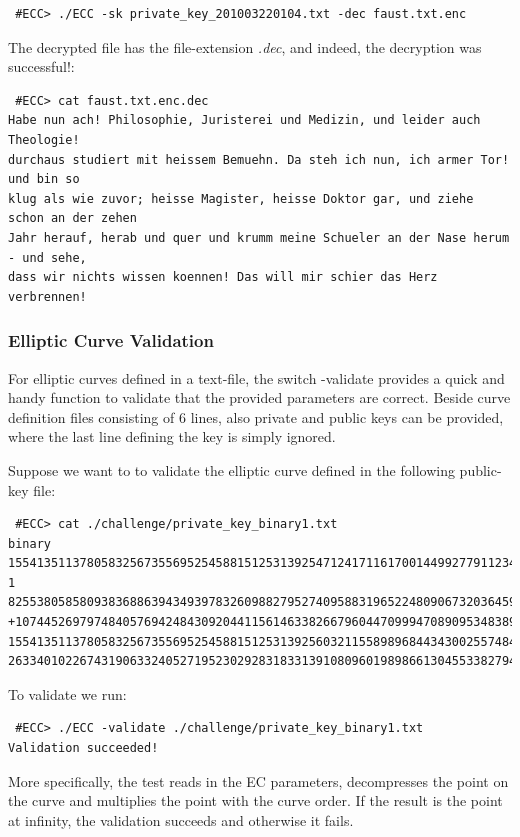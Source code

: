 \documentclass[11pt,english]{article}
\begin{document}
\begin{verbatim}
 #ECC> ./ECC -sk private_key_201003220104.txt -dec faust.txt.enc
\end{verbatim}

The decrypted file has the file-extension \emph{.dec}, and indeed, the decryption was successful!:

\begin{verbatim}
 #ECC> cat faust.txt.enc.dec
Habe nun ach! Philosophie, Juristerei und Medizin, und leider auch Theologie!
durchaus studiert mit heissem Bemuehn. Da steh ich nun, ich armer Tor! und bin so
klug als wie zuvor; heisse Magister, heisse Doktor gar, und ziehe schon an der zehen
Jahr herauf, herab und quer und krumm meine Schueler an der Nase herum - und sehe,
dass wir nichts wissen koennen! Das will mir schier das Herz verbrennen!
\end{verbatim}

\subsubsection{Elliptic Curve Validation}
For elliptic curves defined in a text-file, the switch -validate provides a quick and handy function to validate that the provided parameters are correct. Beside curve definition files consisting of 6 lines, also private and public keys can be provided, where the last line defining the key is simply ignored.

Suppose we want to to validate the elliptic curve defined in the following public-key file:

\begin{verbatim}
 #ECC> cat ./challenge/private_key_binary1.txt
binary
15541351137805832567355695254588151253139254712417116170014499277911234281641667989665
1
8255380585809383688639434939783260988279527409588319652248090673203645932948626009724
+10744526979748405769424843092044115614633826679604470999470890953483892379364112110203
15541351137805832567355695254588151253139256032115589896844343002557484362928298853438
26334010226743190633240527195230292831833139108096019898661304553382794977231705
\end{verbatim}

To validate we run:

\begin{verbatim}
 #ECC> ./ECC -validate ./challenge/private_key_binary1.txt
Validation succeeded!
\end{verbatim}

More specifically, the test reads in the EC parameters, decompresses the point on the curve and multiplies the point with the curve order. If the result is the point at infinity, the validation succeeds and otherwise it fails.
\end{document}
